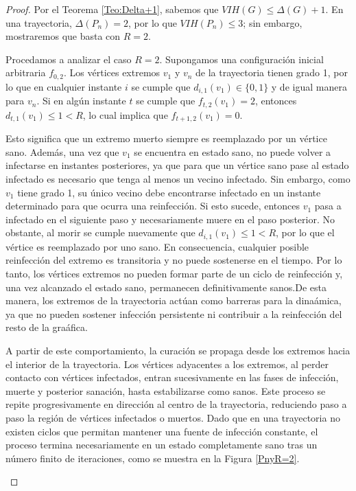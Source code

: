 \documentclass[12pt,titlepage,twoside,openright]{book}
\begin{document}
\begin{proof}
    Por el Teorema \ref{Teo:Delta+1}, sabemos que $VIH(G)\leq \Delta(G)+1$. En una trayectoria, $\Delta(P_n)=2$, por lo que $VIH(P_n)\leq3$; sin embargo, mostraremos que basta con $R=2$.
    
    Procedamos a analizar el caso $R=2$. Supongamos una configuraci\'on inicial arbitraria $f_{0,2}$. Los v\'ertices extremos $v_1$ y $v_n$ de la trayectoria tienen grado 1, por lo que en cualquier instante $i$ se cumple que $d_{i,1}(v_1)\in\{0,1\}$ y de igual manera para $v_n$. Si en alg\'un instante $t$ se cumple que $f_{t,2}(v_1)=2$, entonces $d_{t,1}(v_1)\le 1 < R$, lo cual implica que $f_{t+1,2}(v_1)=0$.
    
    Esto significa que un extremo muerto siempre es reemplazado por un v\'ertice sano. Adem\'as, una vez que $v_1$ se encuentra en estado sano, no puede volver a infectarse en instantes posteriores, ya que para que un v\'ertice sano pase al estado infectado es necesario que tenga al menos un vecino infectado. Sin embargo, como $v_1$ tiene grado 1, su \'unico vecino debe encontrarse infectado en un instante determinado para que ocurra una reinfecci\'on. Si esto sucede, entonces $v_1$ pasa a infectado en el siguiente paso y necesariamente muere en el paso posterior. No obstante, al morir se cumple nuevamente que $d_{i,1}(v_1)\le 1<R$, por lo que el v\'ertice es reemplazado por uno sano. En consecuencia, cualquier posible reinfecci\'on del extremo es transitoria y no puede sostenerse en el tiempo. Por lo tanto, los v\'ertices extremos no pueden formar parte de un ciclo de reinfecci\'on y, una vez alcanzado el estado sano, permanecen definitivamente sanos.De esta manera, los extremos de la trayectoria act\'uan como barreras para la dina\'amica, ya que no pueden sostener infecci\'on persistente ni contribuir a la reinfecci\'on del resto de la gra\'afica.

    A partir de este comportamiento, la curaci\'on se propaga desde los extremos hacia el interior de la trayectoria. Los v\'ertices adyacentes a los extremos, al perder contacto con v\'ertices infectados, entran sucesivamente en las fases de infecci\'on, muerte y posterior sanaci\'on, hasta estabilizarse como sanos. Este proceso se repite progresivamente en direcci\'on al centro de la trayectoria, reduciendo paso a paso la regi\'on de v\'ertices infectados o muertos. Dado que en una trayectoria no existen ciclos que permitan mantener una fuente de infecci\'on constante, el proceso termina necesariamente en un estado completamente sano tras un n\'umero finito de iteraciones, como se muestra en la Figura \ref{PnyR=2}.
    \begin{figure}[h]
        \centering
\end{figure}
\end{proof}
\end{document}
